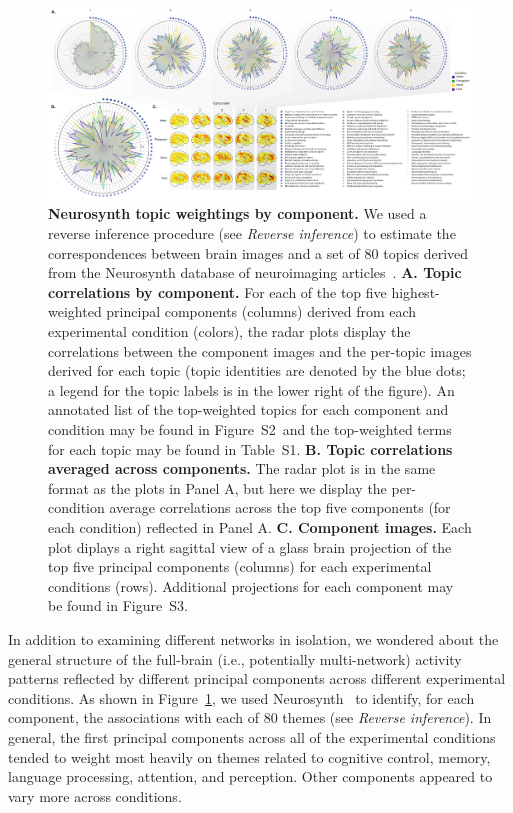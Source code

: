 \documentclass[english, 11pt]{article}
\newcommand{\topTerms}{S2}
\newcommand{\componentBrains}{S3}
\newcommand{\topics}{S1}
\begin{document}
\begin{figure}[tp]
  \centering
  \includegraphics[width=\textwidth]{figs/neurosynth_by_component}

\caption{\textbf{Neurosynth topic weightings by component.} We used a reverse
inference procedure (see \textit{Reverse inference}) to estimate the
correspondences between brain images and a set of 80 topics derived from the
Neurosynth database of neuroimaging articles~\citep{RubiEtal17}. \textbf{A.
Topic correlations by component.} For each of the top five highest-weighted
principal components (columns) derived from each experimental condition
(colors), the radar plots display the correlations between the component images
and the per-topic images derived for each topic (topic identities are denoted
by the blue dots; a legend for the topic labels is in the lower right of the
figure). An annotated list of the top-weighted topics for each component and
condition may be found in Figure~\topTerms~and the top-weighted terms for each
topic may be found in Table~\topics. \textbf{B. Topic correlations averaged
across components.} The radar plot is in the same format as the plots in Panel
A, but here we display the per-condition average correlations across the top
five components (for each condition) reflected in Panel A. \textbf{C. Component
images.} Each plot diplays a right sagittal view of a glass brain projection of
the top five principal components (columns) for each experimental conditions
(rows). Additional projections for each component may be found in
Figure~\componentBrains.}

\label{fig:neurosynth-pca}

\end{figure}

In addition to examining different networks in isolation, we wondered about the
general structure of the full-brain (i.e., potentially multi-network) activity
patterns reflected by different principal components across different
experimental conditions. As shown in Figure~\ref{fig:neurosynth-pca}, we used
Neurosynth~\citep{RubiEtal17} to identify, for each component, the associations
with each of 80 themes (see \textit{Reverse inference}).  In general, the first
principal components across all of the experimental conditions tended to weight
most heavily on themes related to cognitive control, memory,
language processing, attention, and perception.  Other components appeared to
vary more across conditions.
\end{document}
